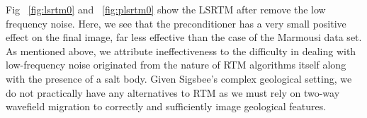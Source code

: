 
Fig ~\ref{fig:lsrtm0} and ~\ref{fig:plsrtm0} show the LSRTM after remove the low frequency noise. Here, we see that the preconditioner has a very small positive effect on the final image, far less effective than the case of the Marmousi data set. As mentioned above, we attribute ineffectiveness to the difficulty in dealing with low-frequency noise originated from the nature of RTM algorithms itself along with the presence of a salt body. Given Sigsbee's complex geological setting, we do not practically have any alternatives to RTM as we must rely on two-way wavefield migration to correctly and sufficiently image geological features.